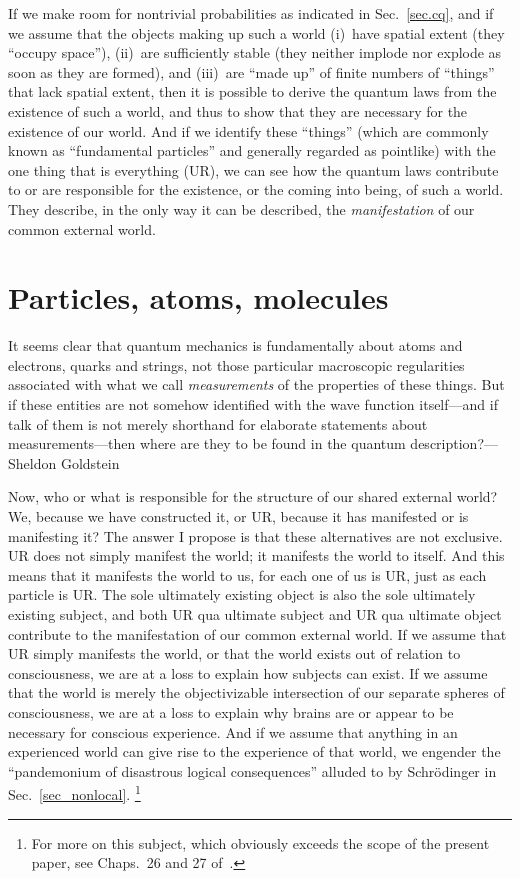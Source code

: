 \documentclass[smallextended]{svjour3}
\begin{document}
If we make room for nontrivial probabilities as indicated in Sec.~\ref{sec.cq}, and if we assume that the objects making up such a world (i)~have spatial extent (they ``occupy space''), (ii)~are sufficiently stable (they neither implode nor explode as soon as they are formed), and (iii)~are ``made up'' of finite numbers of ``things'' that lack spatial extent, then it is possible to derive the quantum laws from the existence of such a world, and thus to show that they are necessary for the existence of our world.\cite{Mohrhoff-QMexplained,Mohrhoff-justso} And if we identify these ``things'' (which are commonly known as ``fundamental particles'' and generally regarded as pointlike) with the one thing that is everything (UR), we can see how the quantum laws contribute to or are responsible for the existence, or the coming into being, of such a world. They describe, in the only way it can be described, the \emph{manifestation} of our common external world.


\section{Particles, atoms, molecules}\label{sec.pa}
{\leftskip\parindent\small It seems clear that quantum mechanics is fundamentally about atoms and electrons, quarks and strings, not those particular macroscopic regularities associated with what we call \emph{measurements} of the properties of these things. But if these entities are not somehow identified with the wave function itself---and if talk of them is not merely shorthand for elaborate statements about measurements---then where are they to be found in the quantum description?---Sheldon Goldstein\cite{Goldstein2017}\par}\medskip

\noindent Now, who or what is responsible for the structure of our shared external world? We, because we have constructed it, or UR, because it has manifested or is manifesting it? The answer I propose is that these alternatives are not exclusive. UR does not simply manifest the world; it manifests the world to itself. And this means that it manifests the world to us, for each one of us is UR, just as each particle is UR. The sole ultimately existing object is also the sole ultimately existing subject, and both UR qua ultimate subject and UR qua ultimate object contribute to the manifestation of our common external world. If we assume that UR simply manifests the world, or that the world exists out of relation to consciousness, we are at a loss to explain how subjects can exist. If we assume that the world is merely the objectivizable intersection of our separate spheres of consciousness, we are at a loss to explain why brains are or appear to be necessary for conscious experience. And if we assume that anything in an experienced world can give rise to the experience of that world, we engender the ``pandemonium of disastrous logical consequences'' alluded to by Schr\"odinger in Sec.~\ref{sec_nonlocal}.%
\footnote{For more on this subject, which obviously exceeds the scope of the present paper, see Chaps.~26 and 27 of~\cite{TWATQM}.}
\end{document}
